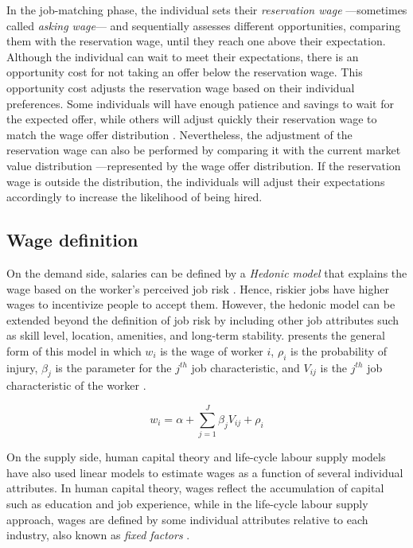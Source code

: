 In the job-matching phase, the individual sets their \textit{reservation wage} —sometimes called \textit{asking wage}— and sequentially assesses different opportunities, comparing them with the reservation wage, until they reach one above their expectation. Although the individual can wait to meet their expectations, there is an opportunity cost for not taking an offer below the reservation wage. This opportunity cost adjusts the reservation wage based on their individual preferences. Some individuals will have enough patience and savings to wait for the expected offer, while others will adjust quickly their reservation wage to match the wage offer distribution \citep{Benjamin2021,Borjas2020}. Nevertheless, the adjustment of the reservation wage can also be performed by comparing it with the current market value distribution —represented by the wage offer distribution. If the reservation wage is outside the distribution, the individuals will adjust their expectations accordingly to increase the likelihood of being hired. 

\subsection{Wage definition}\label{section:wage_definition} 

On the demand side, salaries can be defined by a \textit{Hedonic model} that explains the wage based on the worker's perceived job risk \citep{Borjas2020}. Hence, riskier jobs have higher wages to incentivize people to accept them. However, the hedonic model can be extended beyond the definition of job risk by including other job attributes such as skill level, location, amenities, and long-term stability.  presents the general form of this model in which $w_i$ is the wage of worker $i$, $\rho_i$ is the probability of injury, $\beta_j$ is the parameter for the $j^{th}$ job characteristic, and $V_{ij}$ is the $j^{th}$ job characteristic of the worker \citep{Borjas2020}.

\begin{equation}\label{eq:1}
w_i=\alpha+\sum_{j=1}^{J}\beta_jV_{ij}+\rho_i
\end{equation}

On the supply side, human capital theory and life-cycle labour supply models have also used linear models to estimate wages as a function of several individual attributes. In human capital theory, wages reflect the accumulation of capital such as education and job experience, while in the life-cycle labour supply approach, wages are defined by some individual attributes relative to each industry, also known as \textit{fixed factors} \citep{Borjas2020,Sullivan2010}. 

